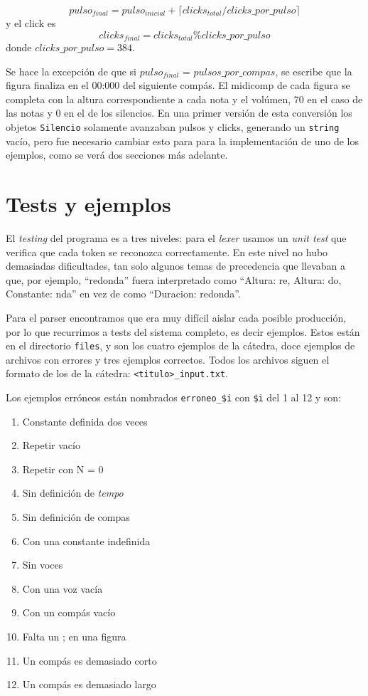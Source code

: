 \documentclass{article}
\begin{document}
$$
pulso_{final} = pulso_{inicial} + \lceil clicks_{total} / clicks\_por\_pulso \rceil
$$
\noindent
y el click es 
$$
clicks_{final} = clicks_{total} \% clicks\_por\_pulso
$$ 
\noindent
donde $clicks\_por\_pulso = 384$.

Se hace la excepción de que si $pulso_{final}$ = $pulsos\_por\_compas$, se escribe que la figura
finaliza en el 00:000 del siguiente compás.  El midicomp de cada figura se completa con la altura
correspondiente a cada nota y el volúmen, 70 en el caso de las notas y 0 en el de los silencios.  En
una primer versión de esta conversión los objetos \texttt{Silencio} solamente avanzaban pulsos y
clicks, generando un \texttt{string} vacío, pero fue necesario cambiar esto para para la
implementación de uno de los ejemplos, como se verá dos secciones más adelante.

\section*{Tests y ejemplos}
El \emph{testing} del programa es a tres niveles: para el \emph{lexer} usamos un \emph{unit test} que
verifica que cada token se reconozca correctamente.  En este nivel no hubo demasiadas
dificultades, tan solo algunos temas de precedencia que llevaban a que, por ejemplo, ``redonda''
fuera interpretado como ``Altura: re, Altura: do, Constante: nda'' en vez de como ``Duracion:
redonda''.

Para el parser encontramos que era muy difícil aislar cada posible producción, por lo que recurrimos
a tests del sistema completo, es decir ejemplos. Estos están en el directorio \texttt{files}, y son
los cuatro ejemplos de la cátedra, doce ejemplos de archivos con errores y tres ejemplos correctos.
Todos los archivos siguen el formato de los de la cátedra: \texttt{<titulo>\_input.txt}.

Los ejemplos erróneos están nombrados \texttt{erroneo\_\$i} con \texttt{\$i} del 1 al 12 y son:

\begin{enumerate}
	\item Constante definida dos veces
	\item Repetir vacío
	\item Repetir con N = 0
	\item Sin definición de \emph{tempo}
	\item Sin definición de compas
	\item Con una constante indefinida
	\item Sin voces
	\item Con una voz vacía
	\item Con un compás vacío
	\item Falta un ; en una figura
	\item Un compás es demasiado corto
	\item Un compás es demasiado largo
\end{enumerate}
\end{document}
